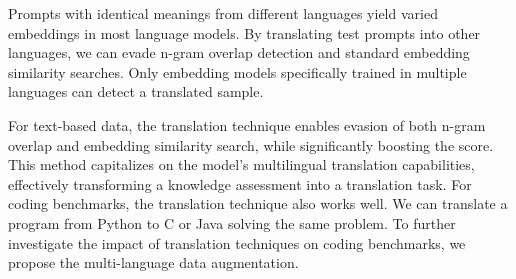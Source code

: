 
Prompts with identical meanings from different languages yield varied embeddings in most language models. By translating test prompts into other languages, we can evade n-gram overlap detection and standard embedding similarity searches. Only embedding models specifically trained in multiple languages can detect a translated sample.



For text-based data, the translation technique enables evasion of both n-gram overlap and embedding similarity search, while significantly boosting the score. This method capitalizes on the model's multilingual translation capabilities, effectively transforming a knowledge assessment into a translation task.
For coding benchmarks, the translation technique also works well. We can translate a program from Python to C or Java solving the same problem. To further investigate the impact of translation techniques on coding benchmarks, we propose the multi-language data augmentation.


